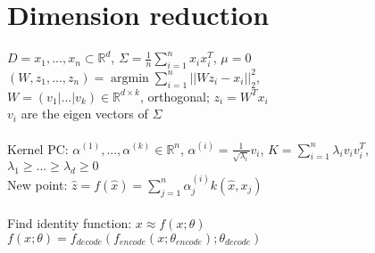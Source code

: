 \section*{Dimension reduction}
$D={x_1,...,x_n} \subset \mathbb{R}^d$,
$\Sigma = \frac{1}{n}\sum_{i=1}^n x_i x_i^T$, $\mu = 0$\\
$(W,z_1,...,z_n) = \operatorname{argmin} \sum_{i=1}^n||W z_i - x_i||_2^2$,\\
$W = (v_1|...|v_k) \in \mathbb{R}^{d \times k}$, orthogonal; $z_i = W^T x_i$ \\ 
$v_i$ are the eigen vectors of $\Sigma$\\
\\
Kernel PC: $\alpha^{(1)},...,\alpha^{(k)}\in \mathbb{R}^n$, $\alpha^{(i)} = \frac{1}{\sqrt{\lambda_i}}v_i$, $K = \sum_{i=1}^n \lambda_i v_i v_i^T$, $\lambda_1 \geq ... \geq \lambda_d \geq 0$\\
New point: $\hat{z} = f(\hat{x}) = \sum_{j=1}^n\alpha_j^{(i)}k(\hat{x},x_j)$\\
\\
Find identity function: $x \approx f(x;\theta)$\\
$f(x;\theta) = f_{decode}(f_{encode}(x;\theta_{encode});\theta_{decode})$